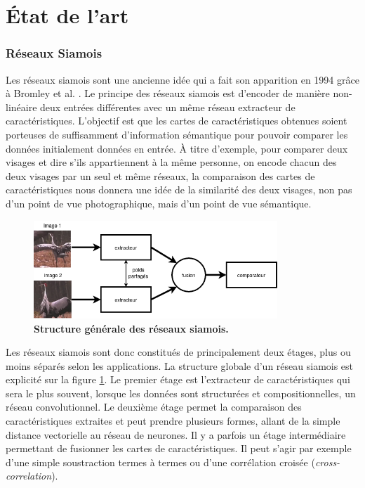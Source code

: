 \documentclass[10pt,twocolumn,letterpaper,french]{article}
\begin{document}
\section*{État de l'art}

\subsubsection*{Réseaux Siamois}

Les réseaux siamois sont une ancienne idée qui a fait son apparition en 1994 grâce à Bromley et al. \cite{siamese}. Le principe des réseaux siamois est d'encoder de manière non-linéaire deux entrées différentes avec un même réseau extracteur de caractéristiques. L'objectif est que les cartes de caractéristiques obtenues soient porteuses de suffisamment d'information sémantique pour pouvoir comparer les données initialement données en entrée. À titre d'exemple, pour comparer deux visages et dire s'ils appartiennent à la même personne, on encode chacun des deux visages par un seul et même réseaux, la comparaison des cartes de caractéristiques nous donnera une idée de la similarité des deux visages, non pas d'un point de vue photographique, mais d'un point de vue sémantique. \\

\begin{figure}[!h]
\centering
\includegraphics[width=260pt]{images/principe/siamese.png}
\caption{\textbf{Structure générale des réseaux siamois.}}
\label{siamese}
\end{figure}

Les réseaux siamois sont donc constitués de principalement deux étages, plus ou moins séparés selon les applications. La structure globale d'un réseau siamois est explicité sur la figure \ref{siamese}. Le premier étage est l'extracteur de caractéristiques qui sera le plus souvent, lorsque les données sont structurées et compositionnelles, un réseau convolutionnel. Le deuxième étage permet la comparaison des caractéristiques extraites et peut prendre plusieurs formes, allant de la simple distance vectorielle au réseau de neurones. Il y a parfois un étage intermédiaire permettant de fusionner les cartes de caractéristiques. Il peut s'agir par exemple d'une simple soustraction termes à termes ou d'une corrélation croisée (\textit{cross-correlation}).\\
\end{document}
